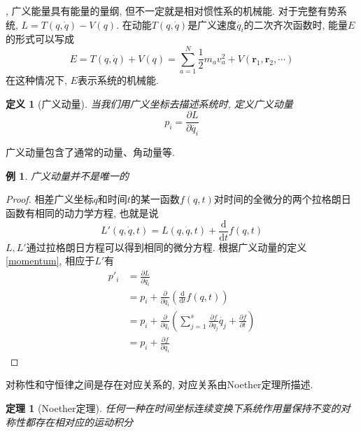 \documentclass[a4paper,11pt]{book}
\newtheorem{definition}{\hspace{2em}定义}[section]
\newtheorem{theorem}{\hspace{2em}定理}[section]
\newtheorem{proof}{证明}[section]
\newtheorem{example}{例}[section]
\begin{document}
, 广义能量具有能量的量纲, 但不一定就是相对惯性系的机械能. 对于完整有势系统, $L=T(q,\dot{q})-V(q)$. 在动能$T(q,\dot{q})$是广义速度$\dot{q_i}$的二次齐次函数时, 能量$E$的形式可以写成
\begin{equation*}
  E=T(q,\dot{q})+V(q)=\sum_{a=1}^{N}\frac{1}{2}m_av_a^2+V(\mathbf{r}_1,\mathbf{r}_2,\cdots)
\end{equation*}
在这种情况下, $E$表示系统的机械能.

\begin{definition}[广义动量]
  当我们用广义坐标去描述系统时, 定义广义动量
  \begin{equation}\label{momentum}
    p_i=\frac{\partial L}{\partial{\dot{q_i}}}
  \end{equation}
\end{definition}
广义动量包含了通常的动量、角动量等.
\begin{example}
  广义动量并不是唯一的
\end{example}
\begin{proof}
  相差广义坐标$q$和时间$t$的某一函数$f(q,t)$对时间的全微分的两个拉格朗日函数有相同的动力学方程, 也就是说
  \begin{equation*}
    L'(q,\dot{q},t)=L(q,\dot{q},t)+\frac{\mathrm{d}}{\mathrm{d}t}f(q,t)
  \end{equation*}
  $L,L'$通过拉格朗日方程可以得到相同的微分方程. 根据广义动量的定义\eqref{momentum}, 相应于$L'$有
  \begin{equation*}
    \begin{split}
       p'_i & =\frac{\partial L}{\partial{\dot{q_i}}} \\
         & =p_i+\frac{\partial}{\partial\dot{q_i}}\left(\frac{\mathrm{d}}{\mathrm{d}t}f(q,t)\right) \\
         & =p_i+\frac{\partial}{\partial{\dot{q_i}}}\left(\sum_{j=1}^{s}\frac{\partial f}{\partial{q_j}}\dot{q_j}+\frac{\partial f}{\partial t}\right) \\
         & =p_i+\frac{\partial{f}}{\partial{q_i}}
    \end{split}
  \end{equation*}
\end{proof}
对称性和守恒律之间是存在对应关系的, 对应关系由Noether定理所描述.
\begin{theorem}[Noether定理]
  任何一种在时间坐标连续变换下系统作用量保持不变的对称性都存在相对应的运动积分
\end{theorem}
\end{document}
